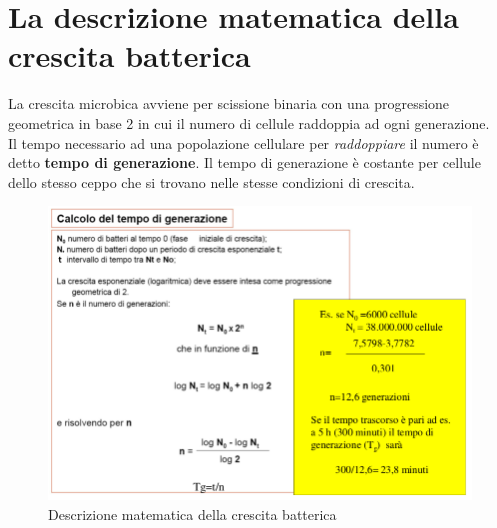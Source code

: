 \documentclass[11pt]{book}
\begin{document}
\begin{itemize}
\end{itemize}


\section{La descrizione matematica della crescita batterica}
La crescita microbica avviene per scissione binaria con una progressione geometrica in base 2 in cui il numero di cellule raddoppia ad ogni generazione.\\
Il tempo necessario ad una popolazione cellulare per \emph{raddoppiare} il numero è detto \textbf{tempo di generazione}. Il tempo di generazione è costante per cellule dello stesso ceppo che si trovano nelle stesse condizioni di crescita.

\clearpage
\begin{figure}[htp]
\centering
\includegraphics[scale=0.5]{img/Descrizione matematica crescita batterica.png}
\caption{Descrizione matematica della crescita batterica}
\label{}
\end{figure}
\end{document}
